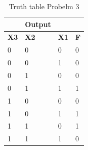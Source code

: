 \documentclass{article}
\begin{document}
\begin{table}[H]
    \centering
    \setlength{\extrarowheight}{0pt}
    \addtolength{\extrarowheight}{\aboverulesep}
    \addtolength{\extrarowheight}{\belowrulesep}
    \setlength{\aboverulesep}{0pt}
    \setlength{\belowrulesep}{0pt}

    \begin{tabular}{| m{5em}| m{5em}| m{5em}|m{5em}|}
        \toprule
        \rowcolor[rgb]{0.4,0.635,1} \multicolumn{3}{|l|}{Input} & Output                                 \\
        \hline
        \textbf{X3}                                             & \textbf{X2} & \textbf{X1} & \textbf{F} \\
        \hline
        0                                                       & 0           & 0           & 0          \\
        \hline
        0                                                       & 0           & 1           & 0          \\
        \hline
        0                                                       & 1           & 0           & 0          \\
        \hline
        0                                                       & 1           & 1           & 1          \\
        \hline
        1                                                       & 0           & 0           & 0          \\
        \hline
        1                                                       & 0           & 1           & 1          \\
        \hline
        1                                                       & 1           & 0           & 1          \\
        \hline
        1                                                       & 1           & 1           & 0          \\
        \bottomrule
    \end{tabular}
    \caption{Truth table Probelm 3}
\end{table}


\end{document}
